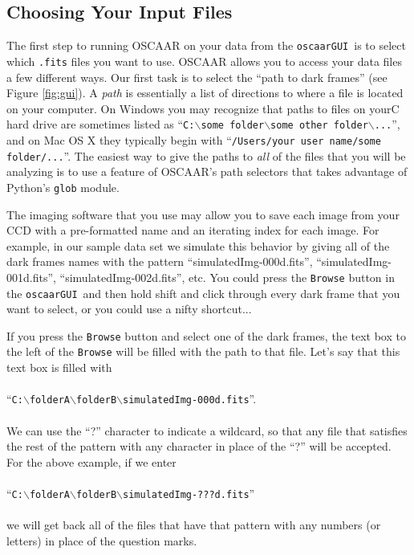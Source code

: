 \documentclass[a4paper]{article}
\newcommand{\code}[1]{\texttt{#1}}
\newcommand{\gui}{\code{oscaarGUI}~}
\begin{document}
\subsection{Choosing Your Input Files}
The first step to running OSCAAR on your data from the \gui is to select which \code{.fits} files you want to use. OSCAAR allows you to access your data files a few different ways. Our first task is to select the ``path to dark frames'' (see Figure \ref{fig:gui}). A \textit{path} is essentially a list of directions to where a file is located on your computer. On Windows you may recognize that paths to files on yourC hard drive are sometimes listed as ``\code{C:$\backslash$some folder$\backslash$some other folder$\backslash$...}'', and on Mac OS X they typically begin with ``\code{/Users/your user name/some folder/...}''. The easiest way to give the paths to \textit{all} of the files that you will be analyzing is to use a feature of OSCAAR's path selectors that takes advantage of Python's \code{glob} module. 

The imaging software that you use may allow you to save each image from your CCD with a pre-formatted name and an iterating index for each image. For example, in our sample data set we simulate this behavior by giving all of the dark frames names with the pattern ``simulatedImg-000d.fits'', ``simulatedImg-001d.fits'', ``simulatedImg-002d.fits'', etc. You could press the \code{Browse} button in the \gui and then hold shift and click through every dark frame that you want to select, or you could use a nifty shortcut...

If you press the \code{Browse} button and select one of the dark frames, the text box to the left of the \code{Browse} will be filled with the path to that file. Let's say that this text box is filled with 
\\\\
\noindent``\code{C:$\backslash$folderA$\backslash$folderB$\backslash$simulatedImg-000d.fits}''. 
\\\\
\noindent We can use the ``?'' character to indicate a wildcard, so that any file that satisfies the rest of the pattern with any character in place of the ``?'' will be accepted. For the above example, if we enter 
\\\\
\noindent ``\code{C:$\backslash$folderA$\backslash$folderB$\backslash$simulatedImg-???d.fits}'' 
\\\\
\noindent we will get back all of the files that have that pattern with any numbers (or letters) in place of the question marks. 
\end{document}
